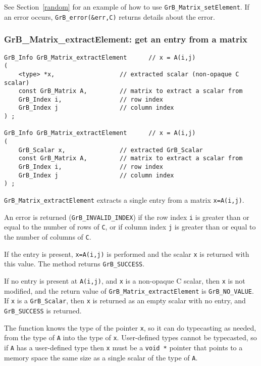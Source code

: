 \documentclass[12pt]{article}
\begin{document}
See Section~\ref{random} for an example of how to use
\verb'GrB_Matrix_setElement'.
If an error occurs, \verb'GrB_error(&err,C)' returns details about the error.

\subsubsection{{\sf GrB\_Matrix\_extractElement:} get an entry from a matrix}
\label{matrix_extractElement}

\begin{mdframed}[userdefinedwidth=6in]
{\footnotesize
\begin{verbatim}
GrB_Info GrB_Matrix_extractElement      // x = A(i,j)
(
    <type> *x,                  // extracted scalar (non-opaque C scalar)
    const GrB_Matrix A,         // matrix to extract a scalar from
    GrB_Index i,                // row index
    GrB_Index j                 // column index
) ;

GrB_Info GrB_Matrix_extractElement      // x = A(i,j)
(
    GrB_Scalar x,               // extracted GrB_Scalar
    const GrB_Matrix A,         // matrix to extract a scalar from
    GrB_Index i,                // row index
    GrB_Index j                 // column index
) ;
\end{verbatim} } \end{mdframed}

\verb'GrB_Matrix_extractElement' extracts a single entry from a matrix
\verb'x=A(i,j)'.

An error is returned (\verb'GrB_INVALID_INDEX') if the row index \verb'i' is
greater than or equal to the number of rows of \verb'C', or if column index
\verb'j' is greater than or equal to the number of columns of \verb'C'.

If the entry is present, \verb'x=A(i,j)' is performed and the scalar \verb'x'
is returned with this value.  The method returns \verb'GrB_SUCCESS'.

If no entry is present at \verb'A(i,j)', and \verb'x' is a non-opaque C scalar,
then \verb'x' is not modified, and the return value of
\verb'GrB_Matrix_extractElement' is \verb'GrB_NO_VALUE'.  If \verb'x' is a
\verb'GrB_Scalar', then \verb'x' is returned as an empty scalar with no entry,
and \verb'GrB_SUCCESS' is returned.

The function knows the type of the pointer \verb'x', so it can do typecasting
as needed, from the type of \verb'A' into the type of \verb'x'.  User-defined
types cannot be typecasted, so if \verb'A' has a user-defined type then
\verb'x' must be a \verb'void *' pointer that points to a memory space the same
size as a single scalar of the type of \verb'A'.
\end{document}
